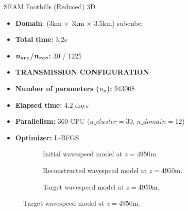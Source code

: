 \begin{frame}[noframenumbering]{SEAM Foothills (Reduced) 3D}

  \vspace{-0.6cm}
   \begin{multicols}{2}

     \begin{itemize}
       \scriptsize
    \item \textbf{Domain}: (3km $\times$ 3km $\times$ 3.5km) subcube;
    \item \textbf{Total time:} 3.2s
    \item \textbf{$\boldsymbol{{n_{src}}}$/$\boldsymbol{{n_{rcv}}}$:} 30 / 1225
    \item \textbf{TRANSMISSION CONFIGURATION}
      \columnbreak
    \item \textbf{Number of parameters (${n_{p}}$):} 943008
    \item \textbf{Elapsed time:} 4.2 days
    \item \textbf{Parallelism:} 360 CPU ($n\_cluster=30$, $n\_domain=12$)
    \item \textbf{Optimizer:} L-BFGS
     \end{itemize}
   \end{multicols}
     \scriptsize
     \setlength{\modelwidth}{4.5cm}

\begin{figure}[!htbp]
\begin{subfigure}{0.3\textwidth}
\renewcommand{\modelfile}{image/seam0_z1}

\caption*{\scriptsize{Initial wavespeed model  at $z=4950$m.}}
\end{subfigure}
\begin{subfigure}{0.3\textwidth}
\renewcommand{\modelfile}{image/seam1_z1}

\caption*{\scriptsize{Reconstructed wavespeed model at $z=4950$m.}}
\end{subfigure}
\begin{subfigure}{0.3\textwidth}
  \vspace{-0.4cm}
\renewcommand{\modelfile}{image/seam2_z1}
\renewcommand{\cmapmin}{2000}
\renewcommand{\cmapmax}{6000}

\vspace{-0.8cm}
\caption*{\scriptsize{Target wavespeed model at $z=4950$m.}}
\end{subfigure}
\end{figure}
\end{frame}






